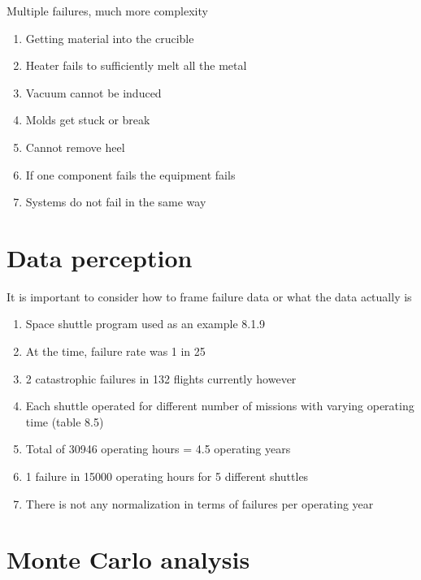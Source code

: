 \documentclass[aspectratio=1610,pdftex,dvipsnames,compress,xcolor={dvipsnames}]{beamer}
\begin{document}
\begin{frame}{Multiple failures, much more complexity}
    \begin{enumerate}[series=outerlist,topsep=0pt,itemsep=15pt,leftmargin=*,label=(\arabic*)]
        \item[]Getting material into the crucible
        \item[]Heater fails to sufficiently melt all the metal  
        \item[]Vacuum cannot be induced  
        \item[]Molds get stuck or break  
        \item[]Cannot remove heel  
        \item[]If one component fails the equipment fails
        \item[]Systems do not fail in the same way
    \end{enumerate}
\end{frame}


\section{Data perception}


\addtocounter{framenumber}{-1}
\begin{frame}{It is important to consider how to frame failure data or what the data actually is}
    \begin{enumerate}[series=outerlist,topsep=0pt,itemsep=11pt,leftmargin=*,label=(\arabic*)]
        \item[]Space shuttle program used as an example 8.1.9  
        \item[]At the time, failure rate was 1 in 25  
        \item[]2 catastrophic failures in 132 flights currently however
        \item[]Each shuttle operated for different number of missions with varying operating time (table 8.5)
        \item[]Total of 30946 operating hours = 4.5 operating years  
        \item[]1 failure in 15000 operating hours for 5 different shuttles  
        \item[]There is not any normalization in terms of failures per operating year
    \end{enumerate}
\end{frame}


\section{Monte Carlo analysis}
\end{document}
